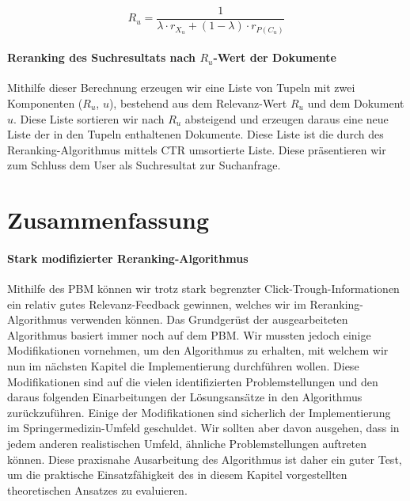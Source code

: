 \vspace{-1em}
\begin{equation}
	R_{u} = \frac{1}{\lambda\cdot r_{X_{u}} + (1 - \lambda)\cdot r_{P(C_{u})}}
\end{equation}
\vspace{-1em}

\pagebreak

\paragraph{Reranking des Suchresultats nach $R_{u}$-Wert der Dokumente}
Mithilfe dieser Berechnung erzeugen wir eine Liste von Tupeln mit zwei Komponenten ($R_{u}$, $u$), bestehend aus dem Relevanz-Wert $R_{u}$ und dem Dokument $u$. Diese Liste sortieren wir nach $R_{u}$ absteigend und erzeugen daraus eine neue Liste der in den Tupeln enthaltenen Dokumente. Diese Liste ist die durch des Reranking-Algorithmus mittels CTR umsortierte Liste. Diese präsentieren wir zum Schluss dem User als Suchresultat zur Suchanfrage. 


\section{Zusammenfassung}
\label{sec:Reranking:Zusammenfassung}

\paragraph{Stark modifizierter Reranking-Algorithmus}
Mithilfe des PBM können wir trotz stark begrenzter Click-Trough-Informationen ein relativ gutes Relevanz-Feedback gewinnen, welches wir im Reranking-Algorithmus verwenden können. Das Grundgerüst der ausgearbeiteten Algorithmus basiert immer noch auf dem PBM. Wir mussten jedoch einige Modifikationen vornehmen, um den Algorithmus zu erhalten, mit welchem wir nun im nächsten Kapitel die Implementierung durchführen wollen. Diese Modifikationen sind auf die vielen identifizierten Problemstellungen und den daraus folgenden Einarbeitungen der Lösungsansätze in den Algorithmus zurückzuführen. Einige der Modifikationen sind sicherlich der Implementierung im Springermedizin-Umfeld geschuldet. Wir sollten aber davon ausgehen, dass in jedem anderen realistischen Umfeld, ähnliche Problemstellungen auftreten können. Diese praxisnahe Ausarbeitung des Algorithmus ist daher ein guter Test, um die praktische Einsatzfähigkeit des in diesem Kapitel vorgestellten theoretischen Ansatzes zu evaluieren. 

